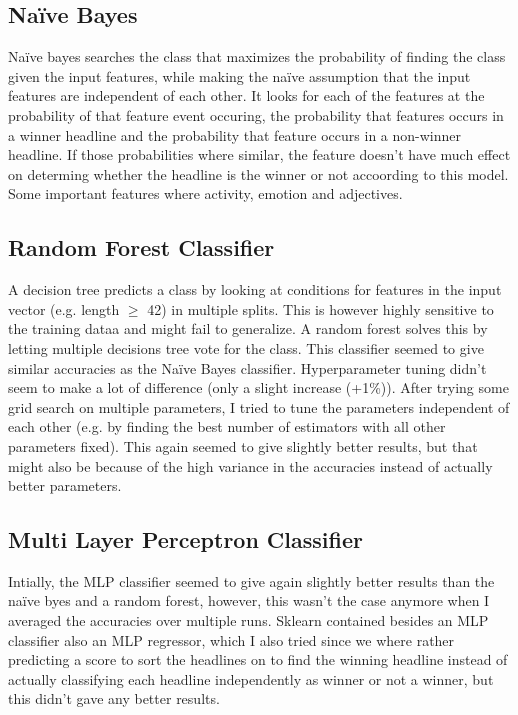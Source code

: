 \documentclass{article}
\begin{document}
 \subsection{Naïve Bayes}
 Naïve bayes searches the class that maximizes the probability of finding the class given the input features, while making the naïve assumption that the input features are independent of each other. It looks for each of the features at the probability of that feature event occuring, the probability that features occurs in a winner headline and the probability that feature occurs in a non-winner headline. If those probabilities where similar, the feature doesn't have much effect on determing whether the headline is the winner or not accoording to this model. Some important features where activity, emotion and adjectives.

 \subsection{Random Forest Classifier}
 A decision tree predicts a class by looking at conditions for features in the input vector (e.g. length $\geq$ 42) in multiple splits. This is however highly sensitive to the training dataa and might fail to generalize. A random forest solves this by letting multiple decisions tree vote for the class. This classifier seemed to give similar accuracies as the Naïve Bayes classifier. Hyperparameter tuning didn't seem to make a lot of difference (only a slight increase (+1\%)).  After trying some grid search on multiple parameters, I tried to tune the parameters independent of each other (e.g. by finding the best number of estimators with all other parameters fixed).  This again seemed to give slightly better results, but that might also be because of the high variance in the accuracies instead of actually better parameters.

 \subsection{Multi Layer Perceptron Classifier}
 Intially, the MLP classifier seemed to give again slightly better results than the naïve byes and a random forest, however, this wasn't the case anymore when I averaged the accuracies over multiple runs. Sklearn contained besides an MLP classifier also an MLP regressor, which I also tried since we where rather predicting a score to sort the headlines on to find the winning headline instead of actually classifying each headline independently as winner or not a winner, but this didn't gave any better results.
\end{document}
